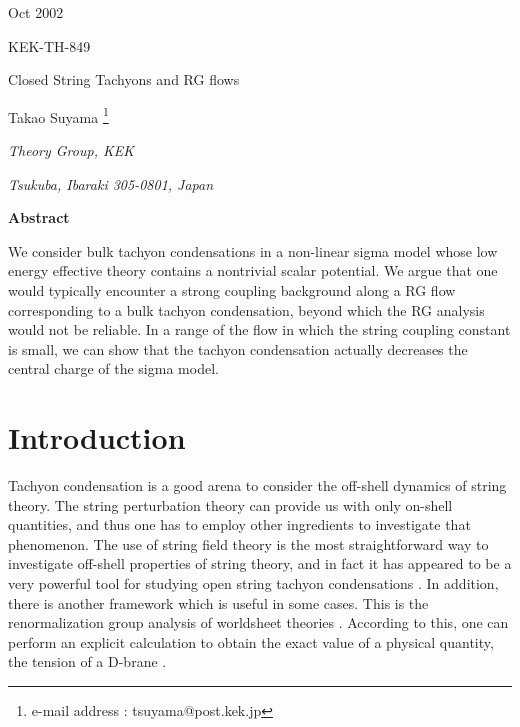 \documentclass[a4paper,a4paper]{article}
\begin{document}
\begin{flushright}
Oct 2002

KEK-TH-849
\end{flushright}

\begin{center}

\vspace{5cm}

{\Large Closed String Tachyons and RG flows}

\vspace{2cm}

Takao Suyama \footnote{e-mail address : tsuyama@post.kek.jp}

\vspace{1cm}

{\it Theory Group, KEK}

{\it Tsukuba, Ibaraki 305-0801, Japan}

\vspace{4cm}

{\bf Abstract} 

\end{center}

We consider bulk tachyon condensations in a non-linear sigma model whose low energy effective theory contains 
a nontrivial scalar potential. 
We argue that one would typically encounter a strong coupling background along a RG flow corresponding to 
a bulk tachyon condensation, beyond which the RG analysis would not be reliable. 
In a range of the flow in which the string coupling constant is small, we can show that the tachyon condensation 
actually decreases the central charge of the sigma model. 

\newpage






















\section{Introduction}

\vspace{5mm}

Tachyon condensation is a good arena to consider the off-shell dynamics of string theory. 
The string perturbation theory can provide us with only on-shell quantities, and thus one has to employ other 
ingredients to investigate that phenomenon. 
The use of string field theory is the most straightforward way to investigate off-shell properties of 
string theory, 
and in fact it has appeared to be a very powerful 
tool for studying open string tachyon condensations \cite{SFT}\cite{SFT2}. 
In addition, there is another framework which is useful in some cases. 
This is the renormalization group analysis of worldsheet theories \cite{RG}. 
According to this, one can perform an explicit calculation to obtain the exact value of a physical quantity, 
the tension of a D-brane \cite{BSFT}\cite{BSFT2}. 
\end{document}
